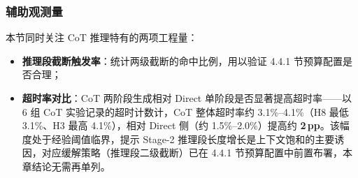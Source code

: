\subsubsection{辅助观测量}
本节同时关注 CoT 推理特有的两项工程量：
\begin{itemize}
    \item \textbf{推理段截断触发率}：统计两级截断的命中比例，用以验证 4.4.1 节预算配置是否合理；
    \item \textbf{超时率对比}：CoT 两阶段生成相对 Direct 单阶段是否显著提高超时率——以 6 组 CoT 实验记录的超时计数计，CoT 整体超时率约 3.1\%--4.1\%（H8 最低 3.1\%、H3 最高 4.1\%），相对 Direct 侧（约 1.5\%--2.0\%）提高约 \textbf{2\,pp}。该幅度处于经验阈值临界，提示 Stage-2 推理段长度增长是上下文饱和的主要诱因，对应缓解策略（推理段二级截断）已在 4.4.1 节预算配置中前置布署，本章结论无需再单列。
\end{itemize}